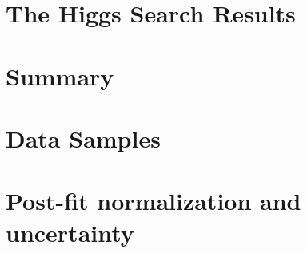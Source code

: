 \documentclass{cmspaper}
\begin{document}
\newpage 


\section{The Higgs Search Results}
   \label{sec:dataresults}
   

\section{Summary}
   \label{sec:summary}
   



\clearpage 
\appendix
\appendixpage

\section{Data Samples}
  \label{sec:appendix_datasets}
  
\clearpage

\section{Post-fit normalization and uncertainty}
  \label{sec:appendix_postfit}
  
\clearpage

\end{document}
